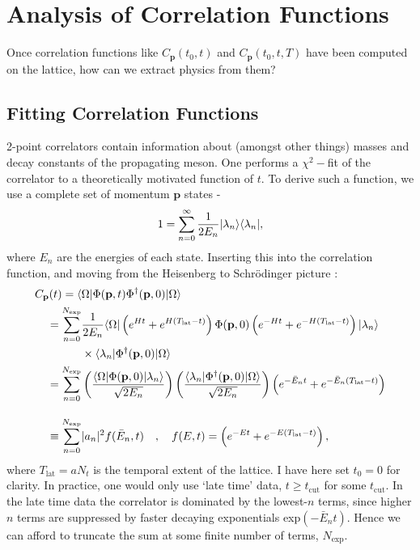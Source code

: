 \section{Analysis of Correlation Functions}

Once correlation functions like $C_{\textbf{p}}(t_0,t)$ and $C_{\textbf{p}}(t_0,t,T)$ have been computed on the lattice, how can we extract physics from them?

\subsection{Fitting Correlation Functions}
\label{sec:correlator_fits}

2-point correlators contain information about (amongst other things) masses and decay constants of the propagating meson. One performs a $\chi^2-$fit of the correlator to a theoretically motivated function of $t$. To derive such a function, we use a complete set of momentum ${\textbf{p}}$ states -
\begin{align}
  1 = \sum_{n=0}^{\infty} {1\over 2E_n} | \lambda_n \rangle \langle \lambda_n |,
\end{align}
where $E_n$ are the energies of each state. Inserting this into the correlation function, and moving from the Heisenberg to Schr\"odinger picture \cite{Weber:2013eba}:
\begin{align}
  C_{\textbf{p}}(t) = \langle& \Omega | \Phi({\textbf{p}},t) \Phi^{\dagger}({\textbf{p}},0)|\Omega\rangle \nonumber \\
  =\sum_{n=0}^{N_{\text{exp}}} & {1\over 2E_n} \langle \Omega | \left( e^{Ht} + e^{H(T_{\text{lat}}-t)} \right)  \Phi({\textbf{p}},0) \left( e^{-Ht} + e^{-H(T_{\text{lat}}-t)} \right) | \lambda_n \rangle
  \nonumber
  \\
  &\times \langle \lambda_n | \Phi^{\dagger}({\textbf{p}},0) | \Omega \rangle
  \nonumber
  \\  = \sum_{n=0}^{N_{\text{exp}}} & \left( {\langle \Omega | \Phi({\textbf{p}},0) | \lambda_n \rangle \over \sqrt{2E_n}} \right) \left( {\langle \lambda_n | \Phi^{\dagger}({\textbf{p}},0) | \Omega \rangle \over \sqrt{2E_n} } \right) \left( e^{-\bar{E}_n t} + e^{-\bar{E}_n (T_{\text{lat}}-t)} \right)
  \nonumber
  \\[10pt] \equiv \sum_{n=0}^{N_{\text{exp}}} & |a_n|^2 f(\bar{E}_n,t) \quad,\quad f(E,t) = \left( e^{-E t} + e^{-E(T_{\text{lat}}-t)} \right),
  \label{eq:multiexponential}
\end{align}
where $T_{\text{lat}}=aN_t$ is the temporal extent of the lattice. I have here set $t_0=0$ for clarity. In practice, one would only use `late time' data,  $t\geq t_{\text{cut}}$ for some $t_{\text{cut}}$. In the late time data the correlator is dominated by the lowest-$n$ terms, since higher $n$ terms are suppressed by faster decaying exponentials exp$(-\bar{E}_nt)$. Hence we can afford to truncate the sum at some finite number of terms, $N_{\text{exp}}$. 

